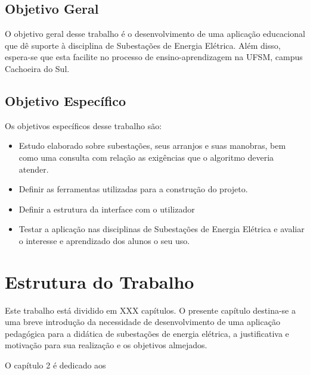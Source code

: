 \subsection{Objetivo Geral}

O objetivo geral desse trabalho é o desenvolvimento de uma aplicação educacional que dê suporte à disciplina de Subestações de Energia Elétrica. Além disso, espera-se que esta facilite no processo de ensino-aprendizagem na UFSM, campus Cachoeira do Sul. 


\subsection{Objetivo Específico}

Os objetivos específicos desse trabalho são:

\begin{itemize}
\begin{itemize}
    \item Estudo elaborado sobre subestações, seus arranjos e suas manobras, bem como uma consulta com relação as exigências que o algoritmo deveria atender.
    
    \item Definir as ferramentas utilizadas para a construção do projeto.

    \item Definir a estrutura da interface com o utilizador
 
    \item  Testar a aplicação nas disciplinas de Subestações de Energia Elétrica e avaliar o interesse e aprendizado dos alunos o seu uso.
    
\end{itemize}
\end{itemize}
\section{Estrutura do Trabalho}

Este trabalho está dividido em XXX capítulos. O presente capítulo destina-se a uma breve introdução da necessidade de desenvolvimento de uma aplicação pedagógica para a didática de subestações de energia elétrica, a justificativa e motivação para sua realização e os objetivos almejados.

O capítulo 2 é dedicado aos %

